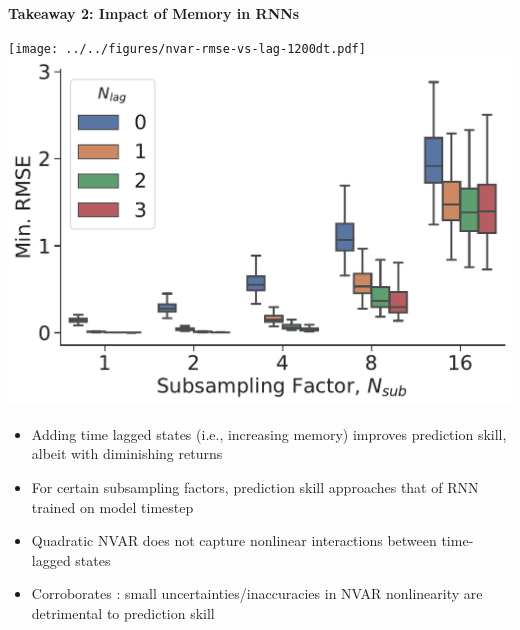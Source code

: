 \vfill
\begin{tcolorbox}[width=\textwidth,
    colframe=sapphire,
    colback=white,
    arc=24pt,
    boxrule=5pt,
    boxsep=0.5em]


   \begin{minipage}{\textwidth}
       \centering
       \textbf{Takeaway 2: Impact of Memory in RNNs}
   \end{minipage}
   \vspace{1em}

    \begin{minipage}{\textwidth}
        \centering
        \texttt{[image: ../../figures/nvar-rmse-vs-lag-1200dt.pdf]}
        \includegraphics[width=.45\textwidth]{../../figures/nvar-mrmse-vs-lag-050samples.pdf}
    \end{minipage}

    \vspace{1.5em}
    \begin{minipage}{\textwidth}
        \begin{itemize}
            \item Adding time lagged states (i.e., increasing memory)
                improves prediction skill, albeit with diminishing returns
            \item For certain subsampling factors, prediction skill
                approaches that of RNN trained on model timestep
            \item Quadratic NVAR does not capture nonlinear
                interactions between time-lagged states
            \item Corroborates \cite{zhang_catch-22_2022}: small
                uncertainties/inaccuracies in NVAR nonlinearity are
                detrimental to prediction skill
        \end{itemize}
    \end{minipage}
\end{tcolorbox}
